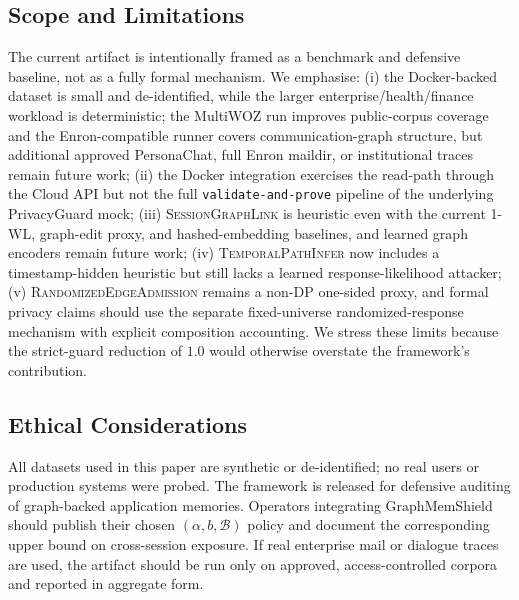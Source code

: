 \documentclass[journal,10pt,twocolumn]{IEEEtran}
\begin{document}
\subsection{Scope and Limitations}
The current artifact is intentionally framed as a benchmark and
defensive baseline, not as a fully formal mechanism. We emphasise:
(i) the Docker-backed dataset is small and de-identified, while the
larger enterprise/health/finance workload is deterministic; the
MultiWOZ run improves public-corpus coverage and the Enron-compatible
runner covers communication-graph structure, but additional approved
PersonaChat, full Enron maildir, or institutional traces remain future work;
(ii) the Docker integration exercises the
read-path through the Cloud API but not the full
\texttt{validate-and-prove} pipeline of the underlying PrivacyGuard
mock; (iii) \textsc{SessionGraphLink} is heuristic even with the
current 1-WL, graph-edit proxy, and hashed-embedding baselines, and
learned graph encoders remain future work; (iv)
\textsc{TemporalPathInfer} now includes a timestamp-hidden heuristic
but still lacks a learned response-likelihood attacker; (v)
\textsc{RandomizedEdgeAdmission} remains a non-DP one-sided proxy, and
formal privacy claims should use the separate fixed-universe
randomized-response mechanism with explicit composition accounting.
We stress these limits because the strict-guard reduction of $1.0$
would otherwise overstate the framework's contribution.

\subsection{Ethical Considerations}
All datasets used in this paper are synthetic or de-identified;
no real users or production systems were probed. The framework is
released for defensive auditing of graph-backed application
memories. Operators integrating GraphMemShield should publish their
chosen $(\alpha, b, \mathcal{B})$ policy and document the
corresponding upper bound on cross-session exposure. If real
enterprise mail or dialogue traces are used, the artifact should be
run only on approved, access-controlled corpora and reported in
aggregate form.

\end{document}
